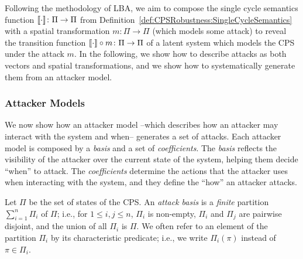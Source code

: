 {%
Following the methodology of LBA, we aim to compose the single cycle semantics function ${{{\llbracket\cdot\rrbracket}}}\colon\Pi\rightarrow\Pi$ from Definition~\ref{def:CPSRobustness:SingleCycleSemantics} with a spatial transformation $m\colon \Pi\rightarrow\Pi$ (which models some attack) to reveal the transition function ${{{\llbracket\cdot\rrbracket}}}\circ m\colon\Pi\rightarrow\Pi$ of a latent system which models the CPS under the attack $m$. In the following, we show how to describe attacks as both vectors and spatial transformations, and we show how to systematically generate them from an attacker model.

\subsubsection{Attacker Models}
We now show how an attacker model --which describes how an attacker may interact with the system and when-- generates a set of attacks. Each attacker model is composed by a \emph{basis} and a set of \emph{coefficients}. The \emph{basis} reflects the visibility of the attacker over the current state of the system, helping them decide ``when'' to attack. The \emph{coefficients} determine the actions that the attacker uses when interacting with the system, and they define the ``how'' an attacker attacks.

\begin{definition}
  \label{def:CPSRobustness:AttackBasis}
Let $\Pi$ be the set of states of the CPS. An \emph{attack basis} is a \emph{finite} partition $\sum_{i=1}^n \Pi_i$ of $\Pi$; i.e., for $1\leq i,j \leq n$, $\Pi_i$ is non-empty, $\Pi_i$ and $\Pi_j$ are pairwise disjoint, and the union of all $\Pi_i$ is $\Pi$. We often refer to an element of the partition $\Pi_i$ by its characteristic predicate; i.e., we write $\Pi_i(\pi)$ instead of $\pi\in \Pi_i$.


\end{definition}}
